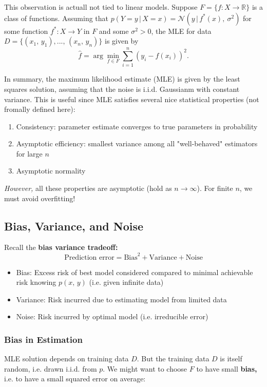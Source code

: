 \documentclass[a4paper]{extarticle}
\begin{document}
This observation is actuall not tied to linear models. Suppose $F = \{f : X \to \mathbb{R}\}$ is a class of functions. Assuming that $p(Y = y \, | \, X = x) = \mathcal{N}(y \, | \, f^*(x), \ \sigma^2)$ for some function $f^* : X \to Y$ in $F$ and some $\sigma^2 > 0$, the MLE for data $D = \{(x_1, \, y_1),..., \, (x_n, \, y_n)\}$ is given by
\[
    \hat{f} = \arg \min_{f \in F} \sum_{i = 1}^n (y_i - f(x_i))^2.
\]

In summary, the maximum likelihood estimate (MLE) is given by the least squares solution, assuming that the noise is i.i.d. Gaussianm with constant variance. This is useful since MLE satisfies several nice statistical properties (not fromally defined here):
\begin{enumerate}
    \item Consistency: parameter estimate converges to true parameters in probability
    \item Asymptotic efficiency: smallest variance among all "well-behaved" estimators for large $n$
    \item Asymptotic normality
\end{enumerate}
\textit{However,} all these properties are asymptotic (hold as $n \to \infty$). For finite $n$, we must avoid overfitting!

\subsection{Bias, Variance, and Noise}

Recall the \textbf{bias variance tradeoff:}
\[
    \text{Prediction error} = \text{Bias}^2 + \text{Variance} + \text{Noise}
\]
\begin{itemize}
    \item Bias: Excess risk of best model considered compared to minimal achievable risk knowing $p(x, \, y)$ (i.e. given infinite data)
    \item Variance: Risk incurred due to estimating model from limited data
    \item Noise: Risk incurred by optimal model (i.e. irreducible error)
\end{itemize}

\subsubsection{Bias in Estimation}

MLE solution depends on training data $D$. But the training data $D$ is itself random, i.e. drawn i.i.d. from $p$. We might want to choose $F$ to have small \textbf{bias,} i.e. to have a small squared error on average:
\end{document}
